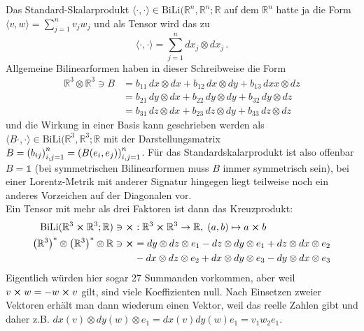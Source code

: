 \documentclass[../H_Analysis_main.tex]{subfiles}
\begin{document}
\begin{bsp}
Das Standard-Skalarprodukt $\langle \cdot, \cdot \rangle \in \text{BiLi}(\mathbb{R}^n, \mathbb{R}^n; \mathbb{R}$ auf dem $\mathbb{R}^n$ hatte ja die Form $\langle v, w \rangle = \sum_{j = 1}^n v_j w_j$ und als Tensor wird das zu
\begin{equation}
\langle \cdot, \cdot \rangle = \sum_{j = 1}^n dx_j \otimes dx_j \, .
\end{equation}
Allgemeine Bilinearformen haben in dieser Schreibweise die Form
\begin{equation}
\begin{split}
\mathbb{R}^3 \otimes \mathbb{R}^3 \ni B &= b_{11} \, dx \otimes dx + b_{12} \, dx \otimes dy + b_{13} \, dxx \otimes dz
\\
&= b_{21} \, dy \otimes dx + b_{22} \, dy \otimes dy + b_{32} \, dy \otimes dz
\\
&= b_{31} \, dz \otimes dx + b_{23} \, dz \otimes dy + b_{33} \, dz \otimes dz
\end{split}
\end{equation}
und die Wirkung in einer Basis kann geschrieben werden als $\langle B \cdot, \cdot \rangle \in \text{BiLi}(\mathbb{R}^3, \mathbb{R}^3; \mathbb{R}$ mit der Darstellungsmatrix $B = \qty(b_{ij})_{i, j = 1}^n = \qty(B(e_i, e_j))_{i, j = 1}^n$. Für das Standardskalarprodukt ist also offenbar $B = \mathds{1}$ (bei symmetrischen Bilinearformen muss $B$ immer symmetrisch sein), bei einer Lorentz-Metrik mit anderer Signatur hingegen liegt teilweise noch ein anderes Vorzeichen auf der Diagonalen vor.\\


Ein Tensor mit mehr als drei Faktoren ist dann das Kreuzprodukt:
\begin{equation}
\begin{split}
\text{BiLi}(\mathbb{R}^3 \cross \mathbb{R}^3; \mathbb{R}) \ni \cross&: \mathbb{R}^3 \cross \mathbb{R}^3 \rightarrow \mathbb{R}, \; (a, b) \mapsto a \cross b
\\
\qty(\mathbb{R}^3)^* \otimes \qty(\mathbb{R}^3)^* \otimes  \mathbb{R} \ni \cross&= dy \otimes dz \otimes e_1 - dz \otimes dy \otimes e_1 + dz \otimes dx \otimes e_2
\\
&- dx \otimes dz \otimes e_2 + dx \otimes dy \otimes e_3 - dy \otimes dx \otimes e_3
\end{split}
\end{equation}
Eigentlich würden hier sogar 27 Summanden vorkommen, aber weil $v \cross w = - w \cross v$ gilt, sind viele Koeffizienten null. Nach Einsetzen zweier Vektoren erhält man dann wiederum einen Vektor, weil das reelle Zahlen gibt und daher z.B. $dx(v) \otimes dy(w) \otimes e_1 = dx(v) dy(w) e_1 = v_1 w_2 e_1$.
\end{bsp}
\end{document}
